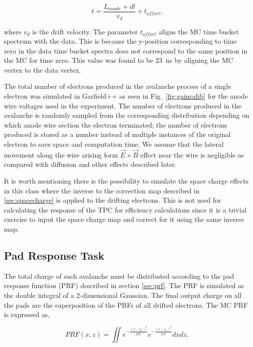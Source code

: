 \begin{equation}
 t = \frac{L_{anode} + dl}{v_d} + t_{offset},
 \label{eq:electronTime}
\end{equation}
 
 where $v_d$ is the drift velocity. The parameter $t_{offset}$ aligns the MC time bucket spectrum with the data. This is because the y-position corresponding to time zero in the data time bucket spectra does not correspond to the same position in the MC for time zero.  This value was found to be \SI{23}{\nano\second} by aligning the MC vertex to the data vertex.

The total number of electrons produced in the avalanche process of a single electron was simulated in Garfield++ as seen in Fig.~\ref{fig:gaincalib} for the anode wire voltages used in the experiment. The number of electrons produced in the avalanche is randomly sampled from the corresponding distribution depending on which anode wire section the electron terminated; the number of electrons produced is stored as a number instead of multiple instances of the original electron to save space and computation time. We assume that the lateral movement along the wire arising form $\vec{E}\times\vec{B}$ effect near the wire is negligible as compared with diffusion and other effects described later. 

It is worth mentioning there is the possibility to simulate the space charge effects in this class where the inverse to the correction map described in \ref{sec:spacecharge} is applied to the drifting electrons. This is not used for calculating the response of the TPC for efficiency calculations since it is a trivial exercise to input the space charge map and correct for it using the same inverse map.  

\subsection{Pad Response Task}
The total charge of each avalanche must be distributed according to the pad response function (PRF) described in section \ref{sec:prf}. The PRF is simulated as the double integral of a 2-dimensional Gaussian. The final output charge on all the pads are the superposition of the PRFs of all drifted electrons. The MC PRF is expressed as, 

\begin{equation}
PRF(x,z) = \iint e^{-\frac{(x-x_o)^2}{2\sigma_x^2}} e^{-\frac{(z-z_o)^2}{2\sigma_z^2}}dxdz,
\end{equation}

